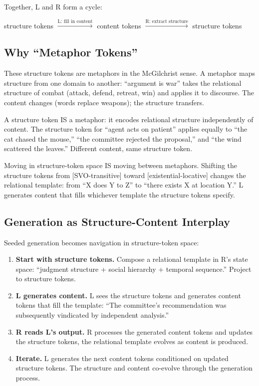 \documentclass[11pt, a4paper]{article}
\theoremstyle{plain}
\theoremstyle{definition}
\theoremstyle{remark}
\begin{document}
Together, L and R form a cycle:
\begin{center}
structure tokens $\xrightarrow{\text{L: fill in content}}$ content tokens $\xrightarrow{\text{R: extract structure}}$ structure tokens
\end{center}

\subsection{Why ``Metaphor Tokens''}

These structure tokens are metaphors in the McGilchrist sense.
A metaphor maps structure from one domain to another: ``argument is war'' takes the relational structure of combat (attack, defend, retreat, win) and applies it to discourse.
The content changes (words replace weapons); the structure transfers.

A structure token IS a metaphor: it encodes relational structure independently of content.
The structure token for ``agent acts on patient'' applies equally to ``the cat chased the mouse,'' ``the committee rejected the proposal,'' and ``the wind scattered the leaves.''
Different content, same structure token.

Moving in structure-token space IS moving between metaphors.
Shifting the structure tokens from [SVO-transitive] toward [existential-locative] changes the relational template: from ``X does Y to Z'' to ``there exists X at location Y.''
L generates content that fills whichever template the structure tokens specify.

\subsection{Generation as Structure-Content Interplay}

Seeded generation becomes navigation in structure-token space:
\begin{enumerate}[nosep]
\item \textbf{Start with structure tokens.} Compose a relational template in R's state space: ``judgment structure + social hierarchy + temporal sequence.'' Project to structure tokens.
\item \textbf{L generates content.} L sees the structure tokens and generates content tokens that fill the template: ``The committee's recommendation was subsequently vindicated by independent analysis.''
\item \textbf{R reads L's output.} R processes the generated content tokens and updates the structure tokens, the relational template evolves as content is produced.
\item \textbf{Iterate.} L generates the next content tokens conditioned on updated structure tokens. The structure and content co-evolve through the generation process.
\end{enumerate}
\end{document}
